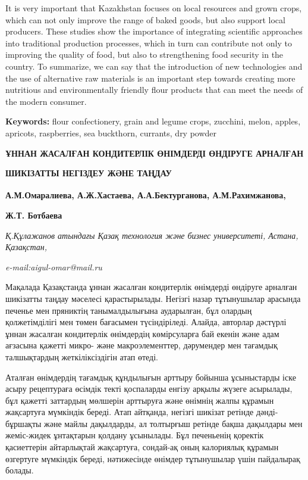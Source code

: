 It is very important that Kazakhstan focuses on local resources and
grown crops, which can not only improve the range of baked goods, but
also support local producers. These studies show the importance of
integrating scientific approaches into traditional production processes,
which in turn can contribute not only to improving the quality of food,
but also to strengthening food security in the country. To summarize, we
can say that the introduction of new technologies and the use of
alternative raw materials is an important step towards creating more
nutritious and environmentally friendly flour products that can meet the
needs of the modern consumer.

{\bfseries Keywords:} flour confectionery, grain and legume crops,
zucchini, melon, apples, apricots, raspberries, sea buckthorn, currants,
dry powder

{\bfseries ҰННАН ЖАСАЛҒАН КОНДИТЕРЛІК ӨНІМДЕРДІ ӨНДІРУГЕ АРНАЛҒАН}

{\bfseries ШИКІЗАТТЫ НЕГІЗДЕУ ЖӘНЕ ТАҢДАУ}

{\bfseries А.М.Омаралиева\textsuperscript{\envelope }, А.Ж.Хастаева,
А.А.Бектурганова, А.М.Рахимжанова,}

{\bfseries Ж.Т. Ботбаева}

\emph{Қ.Құлажанов атындағы Қазақ технология және бизнес университеті,
Астана, Қазақстан,}

\emph{e-mail:aigul-omar@mail.ru}

Мақалада Қазақстанда ұннан жасалған кондитерлік өнімдерді өндіруге
арналған шикізатты таңдау мәселесі қарастырылады. Негізгі назар
тұтынушылар арасында печенье мен пряниктің танымалдылығына аударылған,
бұл олардың қолжетімділігі мен төмен бағасымен түсіндіріледі. Алайда,
авторлар дәстүрлі ұннан жасалған кондитерлік өнімдердің көмірсуларға бай
екенін және адам ағзасына қажетті микро- және макроэлементтер,
дәрумендер мен тағамдық талшықтардың жеткіліксіздігін атап өтеді.

Аталған өнімдердің тағамдық құндылығын арттыру бойынша ұсыныстарды іске
асыру рецептураға өсімдік текті қоспаларды енгізу арқылы жүзеге
асырылады, бұл қажетті заттардың мөлшерін арттыруға және өнімнің жалпы
құрамын жақсартуға мүмкіндік береді. Атап айтқанда, негізгі шикізат
ретінде дәнді-бұршақты және майлы дақылдарды, ал толтырғыш ретінде бақша
дақылдары мен жеміс-жидек ұнтақтарын қолдану ұсынылады. Бұл печеньенің
қоректік қасиеттерін айтарлықтай жақсартуға, сондай-ақ оның калориялық
құрамын өзгертуге мүмкіндік береді, нәтижесінде өнімдер тұтынушылар үшін
пайдалырақ болады.

